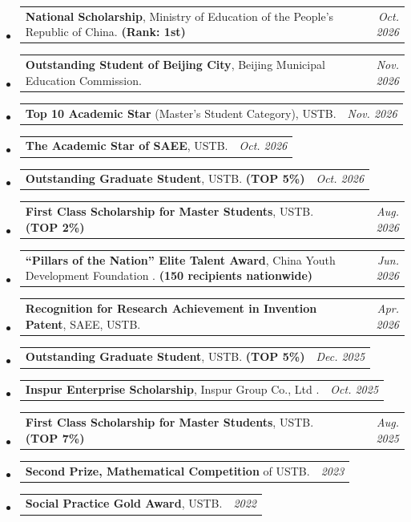 \documentclass[a4paper,11pt]{article}
\makeatletter
\newcommand{\externallink}[2]{%
	#2\nobreak\hspace{0.16em}%
	\href{#1}{\textcolor{ExternalArrowColor}{%
			\faIcon{external-link-alt}}}%
}
\newcommand{\awarditem}[2]{%
	\item
	\begin{tabularx}{\linewidth}{@{}X@{\hspace{0.5em}}r@{}}
		#2 & \textit{#1}
	\end{tabularx}%
}
\makeatother
\begin{document}
\begin{itemize}[leftmargin=0.15in]
	\small
	
	\awarditem{Oct. 2026}{
		\textbf{National Scholarship},
		Ministry of Education of the People's Republic of China.
		\textbf{(Rank: 1st)}
	}
	
	\awarditem{Nov. 2026}{
		\textbf{Outstanding Student of Beijing City},
		Beijing Municipal Education Commission.
	}
	
	\awarditem{Nov. 2026}{
		\textbf{Top 10 Academic Star} (Master's Student Category), USTB.
	}
	
	\awarditem{Oct. 2026}{
		\textbf{The Academic Star of SAEE}, USTB.
	}
	
	\awarditem{Oct. 2026}{
		\textbf{Outstanding Graduate Student}, USTB.
		\textbf{(TOP 5\%)}
	}
	
	\awarditem{Aug. 2026}{
		\textbf{First Class Scholarship for Master Students}, USTB.
		\textbf{(TOP 2\%)}
	}
	
	\awarditem{Jun. 2026}{
		\textbf{“Pillars of the Nation” Elite Talent Award},
		\externallink{https://www.cydf.org.cn/}{China Youth Development Foundation}.
		\textbf{(150 recipients nationwide)}
	}
	
	\awarditem{Apr. 2026}{
		\textbf{Recognition for Research Achievement in Invention Patent}, SAEE, USTB.
	}
	
	\awarditem{Dec. 2025}{
		\textbf{Outstanding Graduate Student}, USTB.
		\textbf{(TOP 5\%)}
	}
	
	\awarditem{Oct. 2025}{
		\textbf{Inspur Enterprise Scholarship},
		\externallink{https://en.inspur.com/}{Inspur Group Co., Ltd}.
	}
	
	\awarditem{Aug. 2025}{
		\textbf{First Class Scholarship for Master Students}, USTB.
		\textbf{(TOP 7\%)}
	}
	
	\awarditem{2023}{
		\textbf{Second Prize, Mathematical Competition} of USTB.
	}
	
	\awarditem{2022}{
		\textbf{Social Practice Gold Award}, USTB.
	}
	
\end{itemize}



\end{document}
